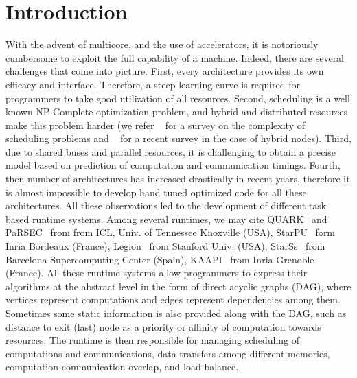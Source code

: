 \documentclass[sigconf]{acmart}
\begin{document}
	
	
	\maketitle
	
	\section{Introduction}
	\label{sec:intro}
	
	With the advent of multicore, and the use of accelerators, it is notoriously cumbersome to exploit the full capability of a machine. Indeed, there are several challenges that come into picture. First, every architecture provides its own efficacy and interface. Therefore, a steep learning curve is required for programmers to take good utilization of all resources. Second, scheduling is a well known NP-Complete optimization problem, and hybrid and distributed resources make this problem harder (we refer ~\cite{webpagescheduling} for a survey on the complexity of scheduling problems and ~\cite{bleuse2015scheduling} for a recent survey in the case of hybrid nodes). Third, due to shared buses and parallel resources, it is challenging to obtain a precise model based on prediction of computation and communication timings. Fourth, then number of architectures has increased drastically in recent years, therefore it is almost impossible to develop hand tuned optimized code for all these architectures. All these observations led to the development of different task based runtime systems. Among several runtimes, we may cite QUARK~\cite{YarKhan:2011:Quark:Manual} and PaRSEC~\cite{parsec} from from ICL, Univ. of Tennessee Knoxville (USA), StarPU~\cite{starpu} form Inria Bordeaux (France), Legion~\cite{legion12} from Stanford Univ. (USA), StarSs~\cite{ompss} from Barcelona Supercomputing Center (Spain), KAAPI~\cite{kaapi} from Inria Grenoble (France). All these runtime systems allow programmers to express their algorithms at the abstract level in the form of direct acyclic graphs (DAG), where vertices represent computations and edges represent dependencies among them. Sometimes some static information is also provided along with the DAG, such as distance to exit (last) node as a priority or affinity of computation towards resources. The runtime is then responsible for managing scheduling of computations and communications, data transfers among different memories, computation-communication overlap, and load balance.
	
\end{document}
